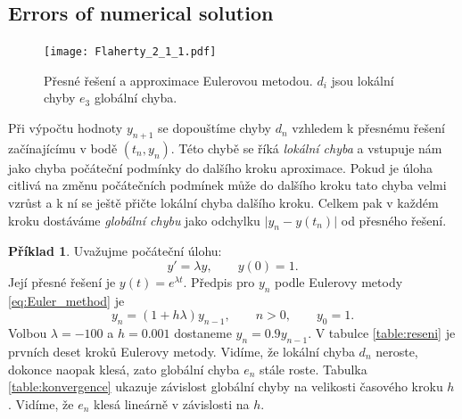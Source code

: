 \documentclass[a4paper, 12pt]{book}
\theoremstyle{definition}
\newtheorem{example}[theorem]{Příklad}
\def\abs#1{\lvert#1\rvert}
\def\df#1{\emph{#1}}
\begin{document}
\subsection{Errors of numerical solution}
\begin{figure}[h]
 \centering
 \texttt{[image: Flaherty\_2\_1\_1.pdf]}
 \caption{Přesné řešení a approximace Eulerovou metodou. $d_i$ jsou lokální chyby $e_3$ globální chyba.}
 \label{fig:Euler_approx}
\end{figure}

Při výpočtu hodnoty $y_{n+1}$ se dopouštíme chyby $d_n$ vzhledem k přesnému řešení začínajícímu v bodě $(t_n, y_n)$. Této chybě se říká \df{lokální chyba}
a vstupuje nám jako chyba počáteční podmínky do dalšího kroku aproximace. Pokud je úloha citlivá na změnu počátečních podmínek může do dalšího kroku tato chyba velmi vzrůst
a k ní se ještě přičte lokální chyba dalšího kroku. Celkem pak v každém kroku dostáváme \df{globální chybu} jako odchylku $\abs{y_n - y(t_n)}$ od přesného řešení.

\begin{example}
\label{ex:decay}
Uvažujme počáteční úlohu:
\[
  y'=\lambda y,\qquad y(0) =1.
\]
Její přesné řešení je $y(t) = e^{\lambda t}$. Předpis pro $y_n$ podle Eulerovy metody \eqref{eq:Euler_method} je
\[
   y_n = (1+ h\lambda)y_{n-1},\qquad n>0,\qquad y_0=1.
\]
Volbou $\lambda=-100$ a $h=0.001$ dostaneme $y_n=0.9y_{n-1}$. V tabulce \ref{table:reseni} je prvních deset kroků Eulerovy metody. Vidíme, že lokální chyba $d_n$ neroste, dokonce naopak klesá, zato globální chyba $e_n$
stále roste. Tabulka \ref{table:konvergence} ukazuje závislost globální chyby na velikosti časového kroku $h$. Vidíme, že $e_n$ klesá lineárně v závislosti na $h$.
\end{example}
\end{document}
